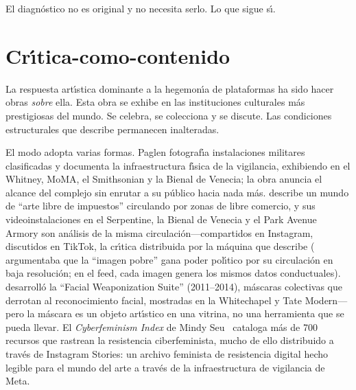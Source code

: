 \documentclass[10pt,letterpaper,twocolumn]{article}
\begin{document}
El diagn\'{o}stico no es original y no necesita serlo. Lo que sigue s\'{\i}.

\section{Cr\'{\i}tica-como-contenido}

La respuesta art\'{\i}stica dominante a la hegemon\'{\i}a de plataformas ha sido hacer obras \emph{sobre} ella. Esta obra se exhibe en las instituciones culturales m\'{a}s prestigiosas del mundo. Se celebra, se colecciona y se discute. Las condiciones estructurales que describe permanecen inalteradas.

El modo adopta varias formas. Paglen fotograf\'{\i}a instalaciones militares clasificadas y documenta la infraestructura f\'{\i}sica de la vigilancia, exhibiendo en el Whitney, MoMA, el Smithsonian y la Bienal de Venecia; la obra anuncia el alcance del complejo sin enrutar a su p\'{u}blico hacia nada m\'{a}s. \citet{steyerl2017duty} describe un mundo de ``arte libre de impuestos'' circulando por zonas de libre comercio, y sus videoinstalaciones en el Serpentine, la Bienal de Venecia y el Park Avenue Armory son an\'{a}lisis de la misma circulaci\'{o}n---compartidos en Instagram, discutidos en TikTok, la cr\'{\i}tica distribuida por la m\'{a}quina que describe (\citet{steyerl2009poor} argumentaba que la ``imagen pobre'' gana poder pol\'{\i}tico por su circulaci\'{o}n en baja resoluci\'{o}n; en el feed, cada imagen genera los mismos datos conductuales). \citet{blas2014informatic} desarroll\'{o} la ``Facial Weaponization Suite'' (2011--2014), m\'{a}scaras colectivas que derrotan al reconocimiento facial, mostradas en la Whitechapel y Tate Modern---pero la m\'{a}scara es un objeto art\'{\i}stico en una vitrina, no una herramienta que se pueda llevar. El \emph{Cyberfeminism Index} de Mindy Seu~\citep{seu2023cyberfeminism} cataloga m\'{a}s de 700 recursos que rastrean la resistencia ciberfeminista, mucho de ello distribuido a trav\'{e}s de Instagram Stories: un archivo feminista de resistencia digital hecho legible para el mundo del arte a trav\'{e}s de la infraestructura de vigilancia de Meta.
\end{document}
